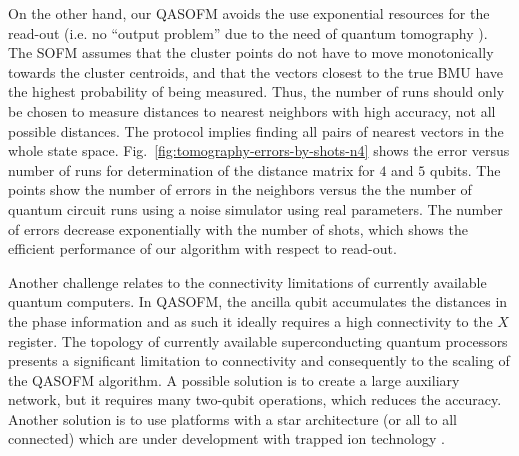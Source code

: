 \documentclass[%
  pra, aps, physrev,
  showkeys,
  twocolumn,
  showpacs,
  superscriptaddress,
  amsmath,amssymb,
  10pt
]{revtex4-2}
\begin{document}
On the other hand, our QASOFM avoids the use exponential resources for the read-out  (i.e. no ``output problem'' due to the need of quantum tomography \cite{biamonte2017}).
The SOFM assumes that the cluster points do not have to move monotonically towards the cluster centroids,
and that the vectors closest to the true BMU have the highest probability of being measured.
Thus, the number of runs should only be chosen to measure distances to nearest neighbors with high accuracy, not all possible distances. The protocol implies finding all pairs of nearest vectors in the whole state space.
Fig.~\ref{fig:tomography-errors-by-shots-n4} shows the error versus number of runs for determination of the distance matrix for $4$  and $5$ qubits.
The points show the number of errors in the neighbors versus the the number of quantum circuit runs using a noise simulator using real parameters.  The number of errors decrease exponentially with the number of shots, which shows the efficient performance of our algorithm with respect to read-out.

Another challenge relates to the connectivity limitations of currently available quantum computers. In QASOFM, the ancilla qubit accumulates the distances in the phase information and as such it ideally requires a high connectivity to the $X $ register.  The topology of currently available superconducting quantum processors  presents a significant limitation to connectivity and consequently to the scaling of the QASOFM algorithm.  A possible solution is to create a large auxiliary network,
but it requires many two-qubit operations, which reduces the accuracy.
Another solution is to use platforms with a star architecture (or all to all connected) which are under development with trapped ion technology \cite{QuantinuumsHSeriesHits}.
\end{document}
